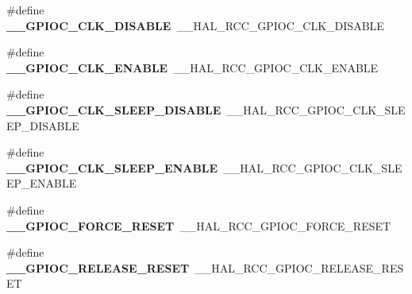 \begin{DoxyCompactItemize}
\item 
\hypertarget{group___h_a_l___r_c_c___aliased_ga3c482a89bbd8e0ce401003a6c9254e3e}{\#define {\bfseries \-\_\-\-\_\-\-G\-P\-I\-O\-C\-\_\-\-C\-L\-K\-\_\-\-D\-I\-S\-A\-B\-L\-E}~\-\_\-\-\_\-\-H\-A\-L\-\_\-\-R\-C\-C\-\_\-\-G\-P\-I\-O\-C\-\_\-\-C\-L\-K\-\_\-\-D\-I\-S\-A\-B\-L\-E}\label{group___h_a_l___r_c_c___aliased_ga3c482a89bbd8e0ce401003a6c9254e3e}

\item 
\hypertarget{group___h_a_l___r_c_c___aliased_gac7ba91faf1c5236aec74293ecd543657}{\#define {\bfseries \-\_\-\-\_\-\-G\-P\-I\-O\-C\-\_\-\-C\-L\-K\-\_\-\-E\-N\-A\-B\-L\-E}~\-\_\-\-\_\-\-H\-A\-L\-\_\-\-R\-C\-C\-\_\-\-G\-P\-I\-O\-C\-\_\-\-C\-L\-K\-\_\-\-E\-N\-A\-B\-L\-E}\label{group___h_a_l___r_c_c___aliased_gac7ba91faf1c5236aec74293ecd543657}

\item 
\hypertarget{group___h_a_l___r_c_c___aliased_ga3ea55b79a7a043bac63c10aa18d9a3ec}{\#define {\bfseries \-\_\-\-\_\-\-G\-P\-I\-O\-C\-\_\-\-C\-L\-K\-\_\-\-S\-L\-E\-E\-P\-\_\-\-D\-I\-S\-A\-B\-L\-E}~\-\_\-\-\_\-\-H\-A\-L\-\_\-\-R\-C\-C\-\_\-\-G\-P\-I\-O\-C\-\_\-\-C\-L\-K\-\_\-\-S\-L\-E\-E\-P\-\_\-\-D\-I\-S\-A\-B\-L\-E}\label{group___h_a_l___r_c_c___aliased_ga3ea55b79a7a043bac63c10aa18d9a3ec}

\item 
\hypertarget{group___h_a_l___r_c_c___aliased_ga4a8f5c33409a5639f17aeed39a22f91c}{\#define {\bfseries \-\_\-\-\_\-\-G\-P\-I\-O\-C\-\_\-\-C\-L\-K\-\_\-\-S\-L\-E\-E\-P\-\_\-\-E\-N\-A\-B\-L\-E}~\-\_\-\-\_\-\-H\-A\-L\-\_\-\-R\-C\-C\-\_\-\-G\-P\-I\-O\-C\-\_\-\-C\-L\-K\-\_\-\-S\-L\-E\-E\-P\-\_\-\-E\-N\-A\-B\-L\-E}\label{group___h_a_l___r_c_c___aliased_ga4a8f5c33409a5639f17aeed39a22f91c}

\item 
\hypertarget{group___h_a_l___r_c_c___aliased_ga63ef2f2f1329d2647e8659b912e4e9c4}{\#define {\bfseries \-\_\-\-\_\-\-G\-P\-I\-O\-C\-\_\-\-F\-O\-R\-C\-E\-\_\-\-R\-E\-S\-E\-T}~\-\_\-\-\_\-\-H\-A\-L\-\_\-\-R\-C\-C\-\_\-\-G\-P\-I\-O\-C\-\_\-\-F\-O\-R\-C\-E\-\_\-\-R\-E\-S\-E\-T}\label{group___h_a_l___r_c_c___aliased_ga63ef2f2f1329d2647e8659b912e4e9c4}

\item 
\hypertarget{group___h_a_l___r_c_c___aliased_ga12465c6f9d1cd0fc2d3a8d61298c6da2}{\#define {\bfseries \-\_\-\-\_\-\-G\-P\-I\-O\-C\-\_\-\-R\-E\-L\-E\-A\-S\-E\-\_\-\-R\-E\-S\-E\-T}~\-\_\-\-\_\-\-H\-A\-L\-\_\-\-R\-C\-C\-\_\-\-G\-P\-I\-O\-C\-\_\-\-R\-E\-L\-E\-A\-S\-E\-\_\-\-R\-E\-S\-E\-T}\label{group___h_a_l___r_c_c___aliased_ga12465c6f9d1cd0fc2d3a8d61298c6da2}


\end{DoxyCompactItemize}
